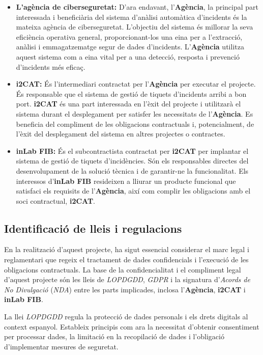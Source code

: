 \begin{itemize}
    \item \textbf{L'agència de ciberseguretat:} D'ara endavant, l'\textbf{Agència}, la principal part interessada i beneficiària del sistema d'anàlisi automàtica d'incidents és la mateixa agència de ciberseguretat. L'objectiu del sistema és millorar la seva eficiència operativa general, proporcionant-los una eina per a l'extracció, anàlisi i emmagatzematge segur de dades d'incidents. L'\textbf{Agència} utilitza aquest sistema com a eina vital per a una detecció, resposta i prevenció d'incidents més eficaç.
    \item \textbf{i2CAT:} És l'intermediari contractat per l'\textbf{Agència} per executar el projecte. És responsable que el sistema de gestió de tiquets d'incidents arribi a bon port. \textbf{i2CAT} és una part interessada en l'èxit del projecte i utilitzarà el sistema durant el desplegament per satisfer les necessitats de l'\textbf{Agència}. Es beneficia del compliment de les obligacions contractuals i, potencialment, de l'èxit del desplegament del sistema en altres projectes o contractes.
     \item \textbf{inLab FIB:} És el subcontractista contractat per \textbf{i2CAT} per implantar el sistema de gestió de tiquets d'incidències. Són els responsables directes del desenvolupament de la solució tècnica i de garantir-ne la funcionalitat. Els interessos d'\textbf{inLab FIB} resideixen a lliurar un producte funcional que satisfaci els requisits de l'\textbf{Agència}, així com complir les obligacions amb el soci contractual, \textbf{i2CAT}.
\end{itemize}


\subsection{Identificació de lleis i regulacions}
En la realització d'aquest projecte, ha sigut essencial considerar el marc legal i reglamentari que regeix el tractament de dades confidencials i l'execució de les obligacions contractuals. La base de la confidencialitat i el compliment legal d'aquest projecte són les lleis de \textit{LOPDGDD}, \textit{GDPR} i la signatura d'\textit{Acords de No Divulgació} (\textit{NDA}) entre les parts implicades, inclosa l'\textbf{Agència}, \textbf{i2CAT} i \textbf{inLab FIB}. 

La llei \textit{LOPDGDD} regula la protecció de dades personals i els drets digitals al context espanyol. Estableix principis com ara la necessitat d'obtenir consentiment per processar dades, la limitació en la recopilació de dades i l'obligació d'implementar mesures de seguretat.

